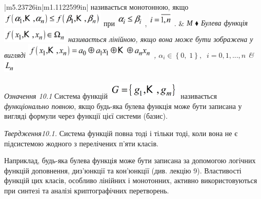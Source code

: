 \documentclass[a4paper]{article}
\makeatletter
\newcommand\arraybslash{\let\\\@arraycr}
\newcounter{}
\makeatother
\begin{document}
\begin{flushleft}
\begin{supertabular}{|m{5.23726in}|m{1.1122599in}|}
називається монотонною, якщо 
\includegraphics[width=1.972in,height=0.278in]{crypt-img/crypt-img186.png}  при
 \includegraphics[width=0.5138in,height=0.25in]{crypt-img/crypt-img187.png} , 
\includegraphics[width=0.4583in,height=0.2638in]{crypt-img/crypt-img188.png} .
&
\centering\arraybslash \itshape М\\\hline
${\blacklozenge}$ Булева функція 
\includegraphics[width=1.25in,height=0.278in]{crypt-img/crypt-img189.png} 
називається лінійною, якщо вона  може бути зображена у вигляді 
\includegraphics[width=2.5in,height=0.278in]{crypt-img/crypt-img190.png} , 
${\alpha _{{i}}\in \left\{0,\;1\right\},\;\;i=0,1,\text{.}\text{.}\text{.},n}$
&
\centering\arraybslash 
\includegraphics[width=0.2083in,height=0.25in]{crypt-img/crypt-img191.png}
\\\hline
\end{supertabular}
\end{flushleft}

\bigskip

\textit{Означення 10.1} Система функцій  
\includegraphics[width=1.3854in,height=0.3465in]{crypt-img/crypt-img192.png}
називається \textit{функціонально повною},  якщо будь-яка булева функція може
бути записана у вигляді формули через функції цієї системи (базис).

\textit{Твердження10.1.} Система функцій повна тоді і тільки тоді, коли вона не
є підсистемою жодного з перелічених п’яти класів.

Наприклад, будь-яка булева функція може бути записана за допомогою логічних
функцій доповнення, диз’юнкції та кон’юнкції (див. лекцію 9). Властивості
функцій цих класів, особливо лінійних і монотонних, активно використовуються
при синтезі та аналізі криптографічних перетворень. 
\end{document}
